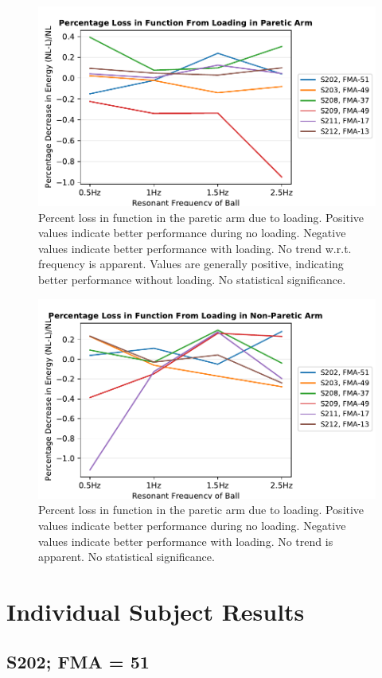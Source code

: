 \documentclass{article}
\begin{document}
\begin{figure}[!ht]
     \centering
     \includegraphics[width=0.5\linewidth]{Plots/pl_A0_seperate.pdf}
	\caption{Percent loss in function in the paretic arm due to loading. Positive values indicate better performance during no loading. Negative values indicate better performance with loading. No trend w.r.t. frequency is apparent. Values are generally positive, indicating better performance without loading. No statistical significance.}
\end{figure}


\begin{figure}[!ht]
     \centering
     \includegraphics[width=0.5\linewidth]{Plots/pl_A1_seperate.pdf}
	\caption{Percent loss in function in the paretic arm due to loading. Positive values indicate better performance during no loading. Negative values indicate better performance with loading. No trend is apparent. No statistical significance.}
\end{figure}


\clearpage
\section{Individual Subject Results}

\subsection{S202; FMA = 51}
\end{document}
